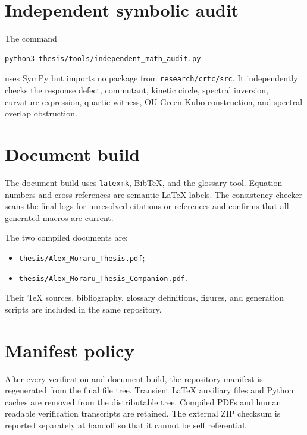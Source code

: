 \section{Independent symbolic audit}
The command
\begin{lstlisting}
python3 thesis/tools/independent_math_audit.py
\end{lstlisting}
uses SymPy but imports no package from \texttt{research/crtc/src}. It independently checks the response defect, commutant, kinetic circle, spectral inversion, curvature expression, quartic witness, OU Green Kubo construction, and spectral overlap obstruction.

\section{Document build}
The document build uses \texttt{latexmk}, BibTeX, and the glossary tool. Equation numbers and cross references are semantic LaTeX labels. The consistency checker scans the final logs for unresolved citations or references and confirms that all generated macros are current.

The two compiled documents are:
\begin{itemize}
\item \texttt{thesis/Alex\_Moraru\_Thesis.pdf};
\item \texttt{thesis/Alex\_Moraru\_Thesis\_Companion.pdf}.
\end{itemize}
Their TeX sources, bibliography, glossary definitions, figures, and generation scripts are included in the same repository.

\section{Manifest policy}
After every verification and document build, the repository manifest is regenerated from the final file tree. Transient LaTeX auxiliary files and Python caches are removed from the distributable tree. Compiled PDFs and human readable verification transcripts are retained. The external ZIP checksum is reported separately at handoff so that it cannot be self referential.
